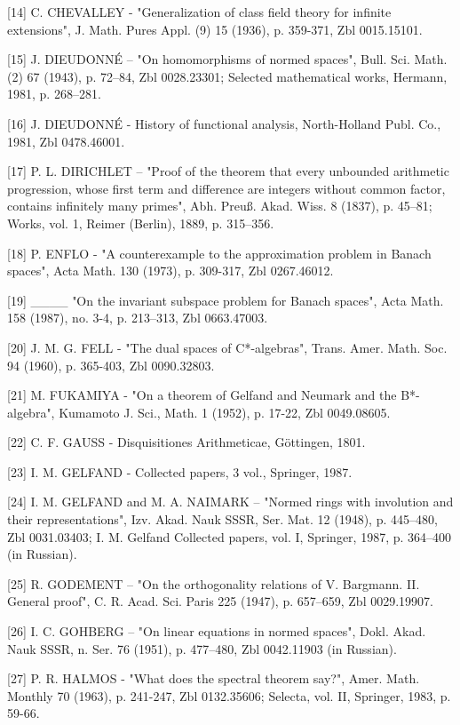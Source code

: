 {[}14{]} C. CHEVALLEY - "Generalization of class field theory for infinite extensions", J. Math. Pures Appl. (9) 15 (1936), p. 359-371, Zbl 0015.15101.

{[}15{]} J. DIEUDONNÉ -- "On homomorphisms of normed spaces", Bull. Sci. Math. (2) 67 (1943), p. 72--84, Zbl 0028.23301; Selected mathematical works, Hermann, 1981, p. 268--281.

{[}16{]} J. DIEUDONNÉ - History of functional analysis, North-Holland Publ. Co., 1981, Zbl 0478.46001.

{[}17{]} P. L. DIRICHLET -- "Proof of the theorem that every unbounded arithmetic progression, whose first term and difference are integers without common factor, contains infinitely many primes", Abh. Preuß. Akad. Wiss. 8 (1837), p. 45--81; Works, vol. 1, Reimer (Berlin), 1889, p. 315--356.

{[}18{]} P. ENFLO - "A counterexample to the approximation problem in Banach spaces", Acta Math. 130 (1973), p. 309-317, Zbl 0267.46012.

{[}19{]} \_\_\_\_ "On the invariant subspace problem for Banach spaces", Acta Math. 158 (1987), no. 3-4, p. 213--313, Zbl 0663.47003.

{[}20{]} J. M. G. FELL - "The dual spaces of C*-algebras", Trans. Amer. Math. Soc. 94 (1960), p. 365-403, Zbl 0090.32803.

{[}21{]} M. FUKAMIYA - "On a theorem of Gelfand and Neumark and the B*-algebra", Kumamoto J. Sci., Math. 1 (1952), p. 17-22, Zbl 0049.08605.

{[}22{]} C. F. GAUSS - Disquisitiones Arithmeticae, Göttingen, 1801.

{[}23{]} I. M. GELFAND - Collected papers, 3 vol., Springer, 1987.

{[}24{]} I. M. GELFAND and M. A. NAIMARK -- "Normed rings with involution and their representations", Izv. Akad. Nauk SSSR, Ser. Mat. 12 (1948), p. 445--480, Zbl 0031.03403; I. M. Gelfand Collected papers, vol. I, Springer, 1987, p. 364--400 (in Russian).

{[}25{]} R. GODEMENT -- "On the orthogonality relations of V. Bargmann. II. General proof", C. R. Acad. Sci. Paris 225 (1947), p. 657--659, Zbl 0029.19907.

{[}26{]} I. C. GOHBERG -- "On linear equations in normed spaces", Dokl. Akad. Nauk SSSR, n. Ser. 76 (1951), p. 477--480, Zbl 0042.11903 (in Russian).

{[}27{]} P. R. HALMOS - "What does the spectral theorem say?", Amer. Math. Monthly 70 (1963), p. 241-247, Zbl 0132.35606; Selecta, vol. II, Springer, 1983, p. 59-66.

